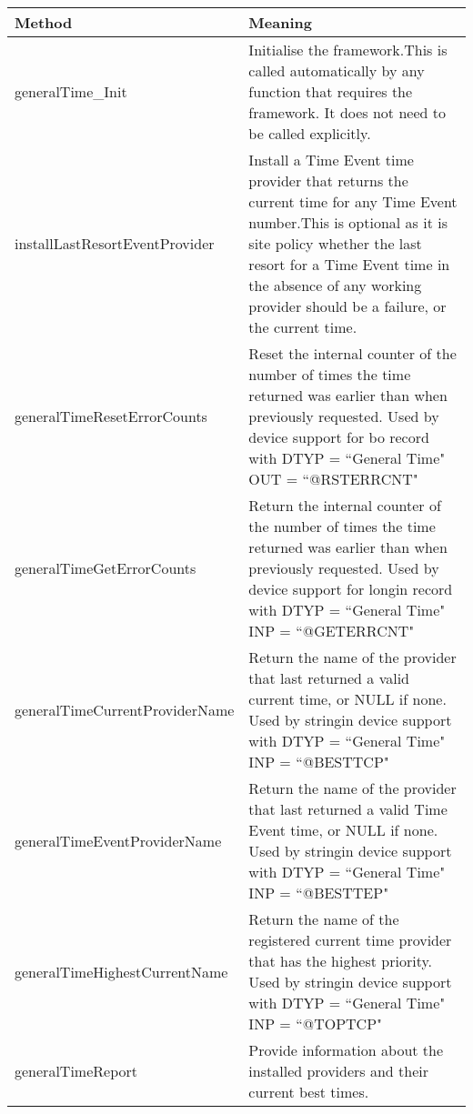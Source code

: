 \begin{center}
\begin{longtable}{p{2.0in}p{4.75in}}
\textbf{Method} & \textbf{Meaning}\\
\hline
generalTime\_Init & Initialise the framework.This is called automatically by any function that requires the framework. It does not need to be called explicitly.\\
installLastResortEventProvider & Install a Time Event time provider that returns the current time for any Time Event number.This is optional as it is site policy whether the last resort for a Time Event time in the absence of any working provider should be a failure, or the current time.\\
generalTimeResetErrorCounts & Reset the internal counter of the number of times the time returned was earlier than when previously requested.  Used by device support for bo record with DTYP = ``General Time" OUT = ``@RSTERRCNT"\\
generalTimeGetErrorCounts & Return the internal counter of the number of times the time returned was earlier than when previously requested.  Used by device support for longin record with DTYP = ``General Time" INP = ``@GETERRCNT"\\
generalTimeCurrentProviderName & Return the name of the provider that last returned a valid current time, or NULL if none.  Used by stringin device support with DTYP = ``General Time" INP = ``@BESTTCP"\\
generalTimeEventProviderName & Return the name of the provider that last returned a valid Time Event time, or NULL if none.  Used by stringin device support with DTYP = ``General Time" INP = ``@BESTTEP"\\
generalTimeHighestCurrentName & Return the name of the registered current time provider that has the highest priority.  Used by stringin device support with DTYP = ``General Time" INP = ``@TOPTCP"\\
generalTimeReport & Provide information about the installed providers and their current best times.
\end{longtable}

\end{center}


